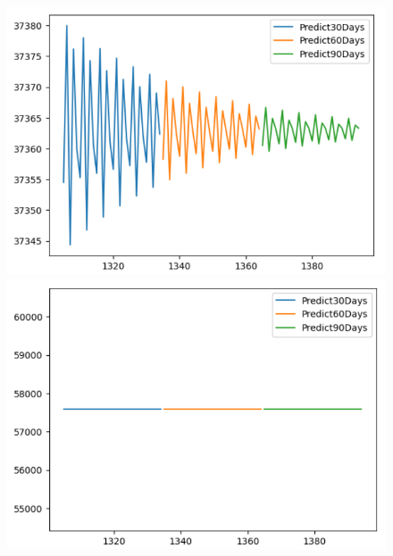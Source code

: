 \begin{figure}[H]
\begin{minipage}{0.15\textwidth}
    \centering
    \includegraphics[width=1\textwidth]{resources/chapter-5/newdata1/predicted/BIDV_ARIMA_9-1_30days.png}
    \end{minipage}
    \hfill
    \begin{minipage}{0.15\textwidth}
    \centering
    \includegraphics[width=1\textwidth]{resources/chapter-5/newdata1/predicted/VCB_ARIMA_7-3_30days.png}
    \end{minipage}
    \hfill
    \begin{minipage}{0.15\textwidth}
    \centering

\end{minipage}
\end{figure}
